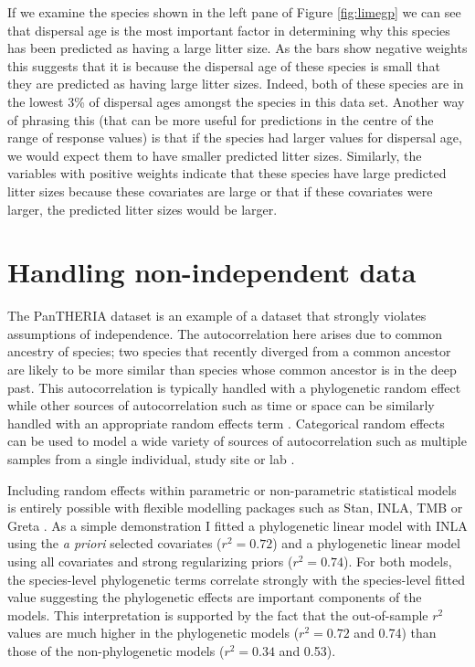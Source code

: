 \documentclass[12pt]{article}
\begin{document}
If we examine the species shown in the left pane of Figure \ref{fig:limegp} we can see that dispersal age is the most important factor in determining why this species has been predicted as having a large litter size.
As the bars show negative weights this suggests that it is because the dispersal age of these species is small that they are predicted as having large litter sizes.
Indeed, both of these species are in the lowest 3\% of dispersal ages amongst the species in this data set.
Another way of phrasing this (that can be more useful for predictions in the centre of the range of response values) is that if the species had larger values for dispersal age, we would expect them to have smaller predicted litter sizes.
Similarly, the variables with positive weights indicate that these species have large predicted litter sizes because these covariates are large or that if these covariates were larger, the predicted litter sizes would be larger.



\section{Handling non-independent data}\label{handling-non-independent-data}

The PanTHERIA dataset is an example of a dataset that strongly violates assumptions of independence.
The autocorrelation here arises due to common ancestry of species; two species that recently diverged from a common ancestor are likely to be more similar than species whose common ancestor is in the deep past.
This autocorrelation is typically handled with a phylogenetic random effect \citep{felsenstein1985phylogenies, ives2006statistics, gay2014parasite, pellissier2012shifts, ferguson2014colony} while other sources of autocorrelation such as time or space can be similarly handled with an appropriate random effects term \citep{ives2006statistics, redding2017evaluating, diggle1998model}.
Categorical random effects can be used to model a wide variety of sources of autocorrelation such as multiple samples from a single individual, study site or lab  \citep{harrison2018brief, bolker2009generalized}.

Including random effects within parametric or non-parametric statistical models is entirely possible with flexible modelling packages such as Stan, INLA, TMB or Greta  \citep{stan, INLA, golding2019greta, tmb}.
As a simple demonstration I fitted a phylogenetic linear model with INLA \citep{INLA} using the \emph{a priori} selected covariates (\(r^2 = 0.72\)) and a phylogenetic linear model using all covariates and strong regularizing priors (\(r^2 = 0.74\)).
For both models, the species-level phylogenetic terms correlate strongly with the species-level fitted value suggesting the phylogenetic effects are important components of the models.
This interpretation is supported by the fact that the out-of-sample $r^2$ values are much higher in the phylogenetic models ($r^2 = 0.72$ and 0.74) than those of the non-phylogenetic models ($r^2 = 0.34$ and 0.53). 
\end{document}
